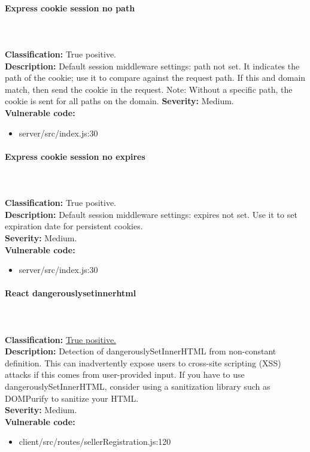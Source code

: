 \documentclass[]{article}
\begin{document}
\paragraph{Express cookie session no path} \mbox{} \\ \\
\textbf{Classification:} True positive. \\ 
\textbf{Description:} Default session middleware settings: path not set. It indicates the path of the cookie; use it to compare against the request path. If this and domain match, then send the cookie in the request. 
Note: Without a specific path, the cookie is sent for all paths on the domain.
\textbf{Severity:} Medium. \\ 
\textbf{Vulnerable code:} 
\begin{itemize}
    \item server/src/index.js:30
\end{itemize}

\paragraph{Express cookie session no expires} \mbox{} \\ \\
\textbf{Classification:} True positive. \\ 
\textbf{Description:}  Default session middleware settings: expires not set. Use it to set expiration date for persistent cookies. \\ 
\textbf{Severity:} Medium. \\ 
\textbf{Vulnerable code:} 
\begin{itemize}
    \item server/src/index.js:30
\end{itemize}

\paragraph{React dangerouslysetinnerhtml} \mbox{} \\ \\
\textbf{Classification:} \hyperref[par:stored_xss]{True positive.} \\ 
\textbf{Description:} Detection of dangerouslySetInnerHTML from non-constant definition. This can 
inadvertently expose users to cross-site scripting (XSS) attacks if this comes from user-provided
input. If you have to use dangerouslySetInnerHTML, consider using a sanitization library such as 
DOMPurify to sanitize your HTML. \\ 
\textbf{Severity:} Medium. \\ 
\textbf{Vulnerable code:} 
\begin{itemize}
    \item client/src/routes/sellerRegistration.js:120
\end{itemize}
\end{document}
